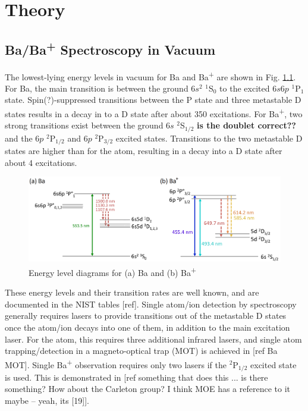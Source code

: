 \chapter{Theory}


\section{Ba/Ba\textsuperscript{+} Spectroscopy in Vacuum}

The lowest-lying energy levels in vacuum for Ba and Ba\textsuperscript{+} are shown in Fig. \ref{fig:elevs}.  For Ba, the main transition is between the ground $6s^{2}$ $^{1}$S$_{0}$ to the excited $6s6p$ $^{1}$P$_{1}$ state.  Spin{\color{red}(?)}-suppressed transitions between the P state and three metastable D states results in a decay in to a D state after about 350 excitations.  For Ba\textsuperscript{+}, two strong transitions exist between the ground $6s$ $^{2}$S$_{1/2}$ \textbf{{\color{red}is the doublet correct??}} and the $6p$ $^{2}$P$_{1/2}$ and $6p$ $^{2}$P$_{3/2}$ excited states.  Transitions to the two metastable D states are higher than for the atom, resulting in a decay into a D state after about 4 excitations.

\begin{figure}[H]
	\includegraphics[width=.9\textwidth]{figures/elevs.png}
	\caption{Energy level diagrams for (a) Ba and (b) Ba\textsuperscript{+}}
    \label{fig:elevs}
\end{figure}

These energy levels and their transition rates are well known, and are documented in the NIST tables [ref].  Single atom/ion detection by spectroscopy generally requires lasers to provide transitions out of the metastable D states once the atom/ion decays into one of them, in addition to the main excitation laser.  For the atom, this requires three additional infrared lasers, and single atom trapping/detection in a magneto-optical trap (MOT) is achieved in [ref Ba MOT].  Single Ba\textsuperscript{+} observation requires only two lasers if the $^{2}$P$_{1/2}$ excited state is used.  This is demonstrated in [ref something that does this ... is there something?  How about the Carleton group?  I think MOE has a reference to it maybe -- yeah, its [19]].

